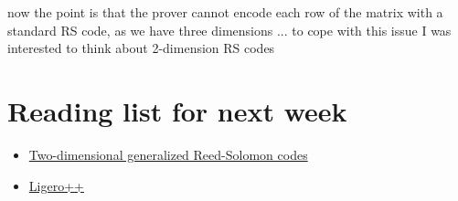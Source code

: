 \documentclass{beamer}
\begin{document}
\begin{frame}
 now the point is that the prover cannot encode each row of the matrix with a standard RS code, as we have three dimensions ... to cope with this issue I was interested to think about 2-dimension RS codes 
\end{frame}

\section{Reading list for next week}


\begin{frame}
	
	\begin{itemize}
	\item
		\href{https://ieeexplore.ieee.org/document/5513621}{Two-dimensional generalized Reed-Solomon codes}
	\item
		 \href{https://dl.acm.org/doi/pdf/10.1145/3372297.3417893}{Ligero++}
	\end{itemize}
	

\end{frame}
\end{document}
